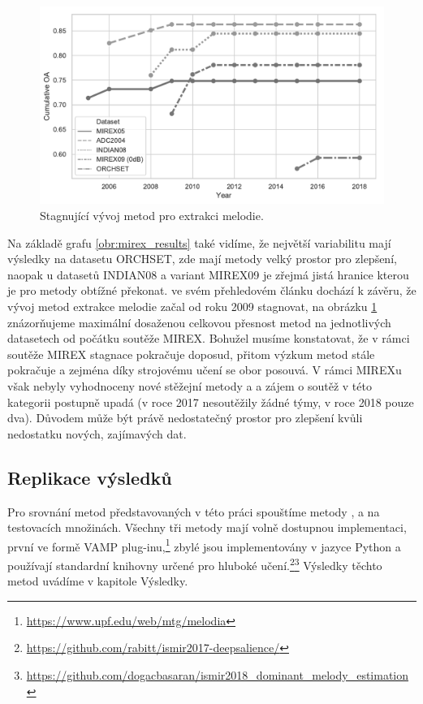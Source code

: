 \begin{figure}[h]\centering
\includegraphics[scale=0.5]{../img/mirex_results_cumulative_grey}
\caption{Stagnující vývoj metod pro extrakci melodie.}
\label{obr:mirex_results_cumulative}
\end{figure}

Na základě grafu \ref{obr:mirex_results} také vidíme, že největší variabilitu mají výsledky na datasetu ORCHSET, zde mají metody velký prostor pro zlepšení, naopak u datasetů INDIAN08 a variant MIREX09 je zřejmá jistá hranice kterou je pro metody obtížné překonat. \cite{Salamon2014} ve svém přehledovém článku dochází k závěru, že vývoj metod extrakce melodie začal od roku 2009 stagnovat, na obrázku \ref{obr:mirex_results_cumulative} znázorňujeme maximální dosaženou celkovou přesnost metod na jednotlivých datasetech od počátku soutěže MIREX. Bohužel musíme konstatovat, že v rámci soutěže MIREX stagnace pokračuje doposud, přitom výzkum metod stále pokračuje a zejména díky strojovému učení se obor posouvá. V rámci MIREXu však nebyly vyhodnoceny nové stěžejní metody \cite{Bittner2017} a \cite{DBasaranSEssid2018} a zájem o soutěž v této kategorii postupně upadá (v roce 2017 nesoutěžily žádné týmy, v roce 2018 pouze dva). Důvodem může být právě nedostatečný prostor pro zlepšení kvůli nedostatku nových, zajímavých dat.


\subsection{Replikace výsledků}

Pro srovnání metod představovaných v této práci spouštíme metody \cite{Salamon2012a}, \cite{Bittner2017} a \cite{DBasaranSEssid2018} na testovacích množinách. Všechny tři metody mají volně dostupnou implementaci, první ve formě VAMP plug-inu,\footnote{\url{https://www.upf.edu/web/mtg/melodia}} zbylé jsou implementovány v jazyce Python a používají standardní knihovny určené pro hluboké učení.\footnote{\url{https://github.com/rabitt/ismir2017-deepsalience/}}\footnote{\url{https://github.com/dogacbasaran/ismir2018_dominant_melody_estimation}} Výsledky těchto metod uvádíme v kapitole Výsledky.

